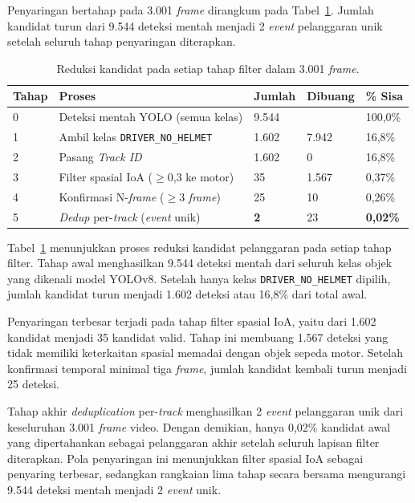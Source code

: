 Penyaringan bertahap pada 3.001 \textit{frame} dirangkum pada Tabel~\ref{tab:filtering-funnel}. Jumlah kandidat turun dari 9.544 deteksi mentah menjadi 2 \textit{event} pelanggaran unik setelah seluruh tahap penyaringan diterapkan.

\begin{table}[htbp]
\centering
\caption{Reduksi kandidat pada setiap tahap filter dalam 3.001 \textit{frame}.}
\label{tab:filtering-funnel}
\small
\setlength{\tabcolsep}{2pt}
\scriptsize
\begin{tabular}{p{1.2cm}p{2.0cm}p{2.0cm}p{2.0cm}p{2.0cm}}
\toprule
\textbf{Tahap} & \textbf{Proses} & \textbf{Jumlah} & \textbf{Dibuang} & \textbf{\% Sisa} \\
\midrule
0 & Deteksi mentah YOLO (semua kelas) & 9.544 &  & 100,0\% \\
1 & Ambil kelas \texttt{DRIVER\_NO\_HELMET} & 1.602 & 7.942 & 16,8\% \\
2 & Pasang \textit{Track ID} & 1.602 & 0 & 16,8\% \\
3 & Filter spasial IoA ($\geq$0,3 ke motor) & 35 & 1.567 & 0,37\% \\
4 & Konfirmasi N-\textit{frame} ($\geq$3 \textit{frame}) & 25 & 10 & 0,26\% \\
5 & \textit{Dedup} per-\textit{track} (\textit{event} unik) & \textbf{2} & 23 & \textbf{0,02\%} \\
\bottomrule
\end{tabular}
\end{table}

Tabel~\ref{tab:filtering-funnel} menunjukkan proses reduksi kandidat pelanggaran pada setiap tahap filter. Tahap awal menghasilkan 9.544 deteksi mentah dari seluruh kelas objek yang dikenali model YOLOv8. Setelah hanya kelas \texttt{DRIVER\_NO\_HELMET} dipilih, jumlah kandidat turun menjadi 1.602 deteksi atau 16,8\% dari total awal.

Penyaringan terbesar terjadi pada tahap filter spasial IoA, yaitu dari 1.602 kandidat menjadi 35 kandidat valid. Tahap ini membuang 1.567 deteksi yang tidak memiliki keterkaitan spasial memadai dengan objek sepeda motor. Setelah konfirmasi temporal minimal tiga \textit{frame}, jumlah kandidat kembali turun menjadi 25 deteksi.

Tahap akhir \textit{deduplication} per-\textit{track} menghasilkan 2 \textit{event} pelanggaran unik dari keseluruhan 3.001 \textit{frame} video. Dengan demikian, hanya 0,02\% kandidat awal yang dipertahankan sebagai pelanggaran akhir setelah seluruh lapisan filter diterapkan. Pola penyaringan ini menunjukkan filter spasial IoA sebagai penyaring terbesar, sedangkan rangkaian lima tahap secara bersama mengurangi 9.544 deteksi mentah menjadi 2 \textit{event} unik.
